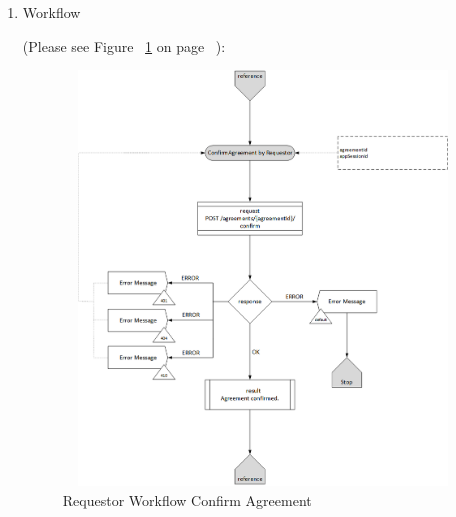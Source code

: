 \begin{enumerate}

\item Workflow

(Please see Figure ~\ref{fig:RCA} on page ~\pageref{fig:RCA}):

\begin{figure}[H]
    \centering
    \includegraphics[width=11cm,height=11cm,angle=0]{./diag/Workflow/Market/ConfirmAgreement-R-Workflow.png}
    \caption{Requestor Workflow Confirm Agreement  }
	\label{fig:RCA}
\end{figure}

\end{enumerate}

\newpage



